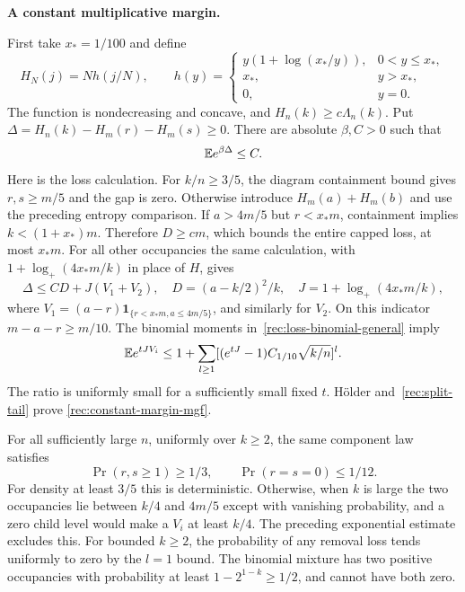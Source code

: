 \medskip\noindent\textbf{A constant multiplicative margin.}\enspace

First take $x_*=1/100$ and define
\[
 H_N(j)=N h(j/N),\qquad
 h(y)=\begin{cases}y(1+\log(x_*/y)),&0<y\le x_*,\\
 x_*,&y>x_*,\\0,&y=0.\end{cases}
\]
The function is nondecreasing and concave, and
$H_n(k)\ge c\Lambda_n(k)$.  Put
$\Delta=H_n(k)-H_m(r)-H_m(s)\ge0$.
There are absolute $\beta,C>0$ such that
\begin{equation}\label{rec:constant-margin-mgf}
 \mathbb E e^{\beta\Delta}\le C.
\end{equation}
Here is the loss calculation.  For $k/n\ge3/5$, the diagram containment
bound gives $r,s\ge m/5$ and the gap is zero.  Otherwise introduce
$H_m(a)+H_m(b)$ and use the preceding entropy comparison.
If $a>4m/5$ but $r<x_*m$, containment implies
$k<(1+x_*)m$.  Therefore $D\ge c m$, which bounds the entire capped
loss, at most $x_*m$.  For all other occupancies the same calculation,
with $1+\log_+(4x_*m/k)$ in place of $H$, gives
\[
 \Delta\le CD+J(V_1+V_2),\quad D=(a-k/2)^2/k,
 \quad J=1+\log_+(4x_*m/k),
\]
where $V_1=(a-r)\mathbf1_{\{r<x_*m,a\le4m/5\}}$, and similarly for
$V_2$.  On this indicator $m-a-r\ge m/10$.
The binomial moments in~\eqref{rec:loss-binomial-general} imply
\[
 \mathbb E e^{tJV_i}\le1+\sum_{l\ge1}
       [(e^{tJ}-1)C_{1/10}\sqrt{k/n}]^l.
\]
The ratio is uniformly small for a sufficiently small fixed $t$.
H\"older and~\eqref{rec:split-tail} prove
\eqref{rec:constant-margin-mgf}.

For all sufficiently large $n$, uniformly over $k\ge2$, the same
component law satisfies
\begin{equation}\label{rec:constant-margin-events}
 \Pr(r,s\ge1)\ge1/3,\qquad \Pr(r=s=0)\le1/12.
\end{equation}
For density at least $3/5$ this is deterministic.  Otherwise, when $k$
is large the two occupancies lie between $k/4$ and $4m/5$ except with
vanishing probability, and a zero child level would make a $V_i$ at least
$k/4$.  The preceding exponential estimate excludes this.  For bounded
$k\ge2$, the probability of any removal loss tends uniformly to zero by
the $l=1$ bound.  The binomial mixture has two positive occupancies with
probability at least $1-2^{1-k}\ge1/2$, and cannot have both zero.

